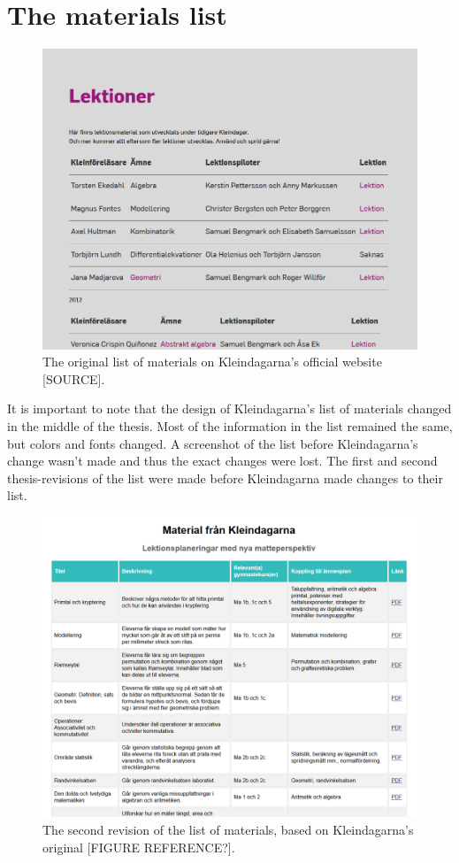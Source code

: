 \section{The materials list}
\begin{figure}[H]
\centering
\includegraphics[width=\linewidth]{figure/screenshot_materiallista_kleindagarna.png}
\caption{The original list of materials on Kleindagarna's official website [SOURCE].}
\end{figure}

It is important to note that the design of Kleindagarna's list of materials changed in the middle of the thesis. Most of the information in the list remained the same, but colors and fonts changed. A screenshot of the list before Kleindagarna's change wasn't made and thus the exact changes were lost. The first and second thesis-revisions of the list were made before Kleindagarna made changes to their list.

\begin{figure}[H]
\centering
\includegraphics[width=\linewidth]{figure/screenshot_materiallista_revision_2.png}
\caption{The second revision of the list of materials, based on Kleindagarna's original [FIGURE REFERENCE?].}
\end{figure}

